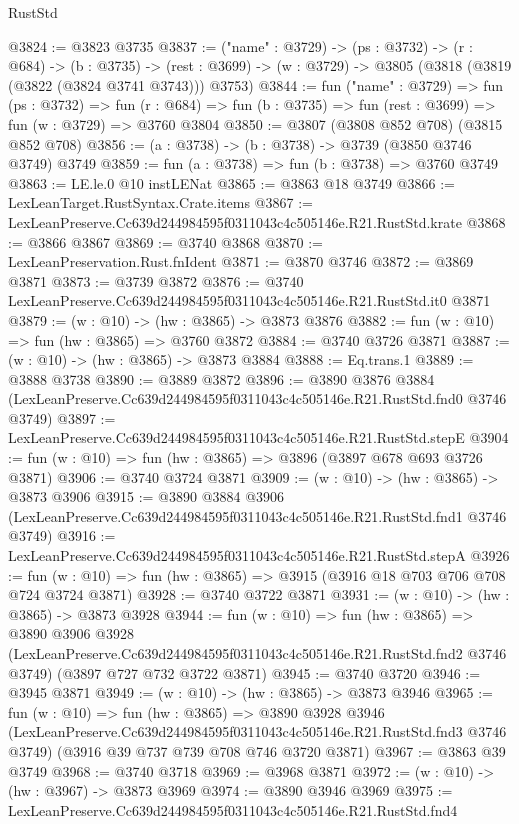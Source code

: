 \begin{lexlean}{RustStd}
\begin{coremodule}
@3824 := @3823 @3735
@3837 := ("name" : @3729) ->
  (ps : @3732) ->
  (r : @684) ->
  (b : @3735) ->
  (rest : @3699) -> (w : @3729) -> @3805 (@3818 (@3819 (@3822 (@3824 @3741 @3743))) @3753)
@3844 := fun ("name" : @3729) =>
  fun (ps : @3732) =>
  fun (r : @684) => fun (b : @3735) => fun (rest : @3699) => fun (w : @3729) => @3760 @3804
@3850 := @3807 (@3808 @852 @708) (@3815 @852 @708)
@3856 := (a : @3738) -> (b : @3738) -> @3739 (@3850 @3746 @3749) @3749
@3859 := fun (a : @3738) => fun (b : @3738) => @3760 @3749
@3863 := LE.le.{0} @10 instLENat
@3865 := @3863 @18 @3749
@3866 := LexLeanTarget.RustSyntax.Crate.items
@3867 := LexLeanPreserve.Cc639d244984595f0311043c4c505146e.R21.RustStd.krate
@3868 := @3866 @3867
@3869 := @3740 @3868
@3870 := LexLeanPreservation.Rust.fnIdent
@3871 := @3870 @3746
@3872 := @3869 @3871
@3873 := @3739 @3872
@3876 := @3740 LexLeanPreserve.Cc639d244984595f0311043c4c505146e.R21.RustStd.it0 @3871
@3879 := (w : @10) -> (hw : @3865) -> @3873 @3876
@3882 := fun (w : @10) => fun (hw : @3865) => @3760 @3872
@3884 := @3740 @3726 @3871
@3887 := (w : @10) -> (hw : @3865) -> @3873 @3884
@3888 := Eq.trans.{1}
@3889 := @3888 @3738
@3890 := @3889 @3872
@3896 := @3890
    @3876
    @3884
    (LexLeanPreserve.Cc639d244984595f0311043c4c505146e.R21.RustStd.fnd0 @3746 @3749)
@3897 := LexLeanPreserve.Cc639d244984595f0311043c4c505146e.R21.RustStd.stepE
@3904 := fun (w : @10) => fun (hw : @3865) => @3896 (@3897 @678 @693 @3726 @3871)
@3906 := @3740 @3724 @3871
@3909 := (w : @10) -> (hw : @3865) -> @3873 @3906
@3915 := @3890
    @3884
    @3906
    (LexLeanPreserve.Cc639d244984595f0311043c4c505146e.R21.RustStd.fnd1 @3746 @3749)
@3916 := LexLeanPreserve.Cc639d244984595f0311043c4c505146e.R21.RustStd.stepA
@3926 := fun (w : @10) => fun (hw : @3865) => @3915 (@3916 @18 @703 @706 @708 @724 @3724 @3871)
@3928 := @3740 @3722 @3871
@3931 := (w : @10) -> (hw : @3865) -> @3873 @3928
@3944 := fun (w : @10) =>
  fun (hw : @3865) =>
  @3890
    @3906
    @3928
    (LexLeanPreserve.Cc639d244984595f0311043c4c505146e.R21.RustStd.fnd2 @3746 @3749)
    (@3897 @727 @732 @3722 @3871)
@3945 := @3740 @3720
@3946 := @3945 @3871
@3949 := (w : @10) -> (hw : @3865) -> @3873 @3946
@3965 := fun (w : @10) =>
  fun (hw : @3865) =>
  @3890
    @3928
    @3946
    (LexLeanPreserve.Cc639d244984595f0311043c4c505146e.R21.RustStd.fnd3 @3746 @3749)
    (@3916 @39 @737 @739 @708 @746 @3720 @3871)
@3967 := @3863 @39 @3749
@3968 := @3740 @3718
@3969 := @3968 @3871
@3972 := (w : @10) -> (hw : @3967) -> @3873 @3969
@3974 := @3890 @3946 @3969
@3975 := LexLeanPreserve.Cc639d244984595f0311043c4c505146e.R21.RustStd.fnd4

\end{coremodule}
\end{lexlean}
